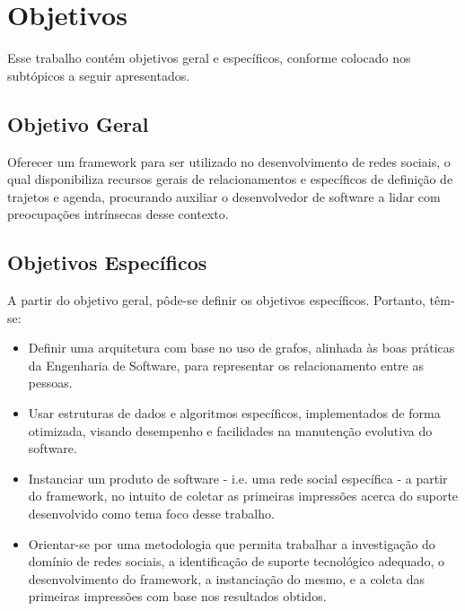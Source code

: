 \section{Objetivos}

Esse trabalho contém objetivos geral e específicos, conforme colocado nos subtópicos a seguir apresentados.

\subsection{Objetivo Geral}

Oferecer um framework para ser utilizado no desenvolvimento de redes sociais, o qual disponibiliza recursos gerais de relacionamentos e específicos de definição de trajetos e agenda, procurando auxiliar o desenvolvedor de software a lidar com preocupações intrínsecas desse contexto.

\subsection{Objetivos Específicos}

A partir do objetivo geral, pôde-se definir os objetivos específicos. Portanto, têm-se:

\begin{itemize}
	\item Definir uma arquitetura com base no uso de grafos, alinhada às boas práticas da Engenharia de Software, para representar os relacionamento entre as pessoas.
	\item Usar estruturas de dados e algoritmos específicos, implementados de forma otimizada, visando desempenho e facilidades na manutenção evolutiva do software.
	\item Instanciar um produto de software - i.e. uma rede social específica - a partir do framework, no intuito de coletar as primeiras impressões acerca do suporte desenvolvido como tema foco desse trabalho.
	\item Orientar-se por uma metodologia que permita trabalhar a investigação do domínio de redes sociais, a identificação de suporte tecnológico adequado, o desenvolvimento do framework, a instanciação do mesmo, e a coleta das primeiras impressões com base nos resultados obtidos.

\end{itemize}

